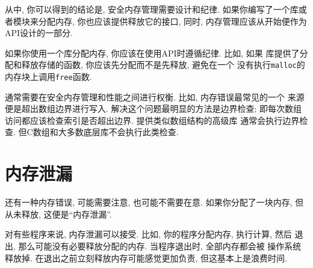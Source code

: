 \documentclass[12pt]{book}
\begin{document}
{%
从中, 你可以得到的结论是, 安全内存管理需要设计和纪律. 
如果你编写了一个库或者模块来分配内存, 你也应该提供释放它的接口, 
同时, 内存管理应该从开始便作为API设计的一部分.  

如果你使用一个库分配内存, 你应该在使用API时遵循纪律. 比如, 如果
库提供了分配和释放存储的函数, 你应该先分配而不是先释放, 避免在一个
没有执行{\tt malloc}的内存块上调用{\tt free}函数. 

通常需要在安全内存管理和性能之间进行权衡. 比如, 内存错误最常见的一个
来源便是超出数组边界进行写入. 解决这个问题最明显的方法是边界检查;
即每次数组访问都应该检查索引是否超出边界. 提供类似数组结构的高级库
通常会执行边界检查. 但C数组和大多数底层库不会执行此类检查. 


\section{内存泄漏}
\label{leak}

还有一种内存错误, 可能需要注意, 也可能不需要在意. 
如果你分配了一块内存, 但从未释放, 这便是``内存泄漏''.

对有些程序来说, 内存泄漏可以接受. 比如, 你的程序分配内存, 执行计算, 然后
退出, 那么可能没有必要释放分配的内存. 当程序退出时, 全部内存都会被
操作系统释放掉. 在退出之前立刻释放内存可能感觉更加负责, 
但这基本上是浪费时间. 

}
\end{document}
